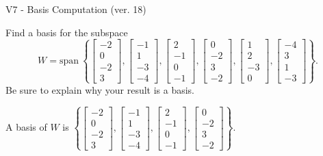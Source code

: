 \begin{exercise}
  \begin{exerciseTitle}V7 - Basis Computation (ver. 18)\end{exerciseTitle}
  \begin{exerciseStatement}
    Find a basis for the subspace 
\[W=\mathrm{span}\ \left\{\left[\begin{array}{r}
-2 \\
0 \\
-2 \\
3
\end{array}\right] , \left[\begin{array}{r}
-1 \\
1 \\
-3 \\
-4
\end{array}\right] , \left[\begin{array}{r}
2 \\
-1 \\
0 \\
-1
\end{array}\right] , \left[\begin{array}{r}
0 \\
-2 \\
3 \\
-2
\end{array}\right] , \left[\begin{array}{r}
1 \\
2 \\
-3 \\
0
\end{array}\right] , \left[\begin{array}{r}
-4 \\
3 \\
1 \\
-3
\end{array}\right]\right\}.\]
 Be sure to explain why your result is a basis.


  \end{exerciseStatement}
  \begin{exerciseAnswer}
   A basis of \(W\) is  \(\left\{\left[\begin{array}{r}
-2 \\
0 \\
-2 \\
3
\end{array}\right] , \left[\begin{array}{r}
-1 \\
1 \\
-3 \\
-4
\end{array}\right] , \left[\begin{array}{r}
2 \\
-1 \\
0 \\
-1
\end{array}\right] , \left[\begin{array}{r}
0 \\
-2 \\
3 \\
-2
\end{array}\right]\right\}\).
  


  \end{exerciseAnswer}
\end{exercise}